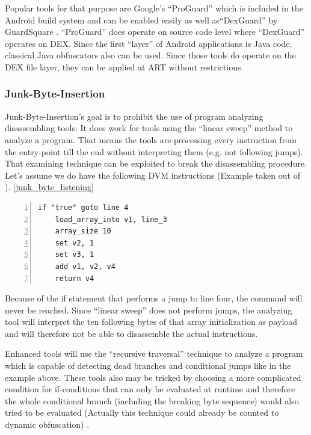 Popular tools for that purpose are Google's ``ProGuard''
\parencite{proguardtool} which is included in the Android build system and
can be enabled easily as well as``DexGuard'' by GuardSquare
\parencite{dexguardtool}. ``ProGuard'' does
operate on source code level where ``DexGuard'' operates on DEX.
Since the first ``layer'' of Android applications is Java code, classical Java
obfuscators also can be used.
Since those tools do operate on the DEX file layer, they can be applied at ART without restrictions.

\subsubsection{Junk-Byte-Insertion}
Junk-Byte-Insertion's goal is to prohibit the use of program analyzing
disassembling tools. It does work for tools using the
``linear sweep'' method to analyze a program. That means
the tools are processing every instruction from the entry-point
till the end without interpreting them (e.g. not following jumps).
That examining technique can be exploited to break the disassembling
procedure. Let's assume we do have the following DVM instructions (Example taken out of \parencite{lvl_imp}).
\autoref{junk_byte_listening}

  \begin{lstlisting}[language={[x64]Assembler}, caption=Junk-Byte-Insertion, label=junk_byte_listening, numbers=left]
    if "true" goto line 4
    load_array_into v1, line_3
    array_size 10
    set v2, 1
    set v3, 1
    add v1, v2, v4
    return v4
  \end{lstlisting}


Because of the if statement that performs a jump to line four, the  command will never be reached.
Since ``linear sweep'' does not perform jumps, the analyzing tool
will interpret the ten following bytes of that array initialization as payload and will therefore not be able to disassemble the actual instructions.

Enhanced tools will use the ``recursive traversal'' technique to analyze a
program which is capable of detecting dead branches and conditional jumps like in the example above.
These tools also may be tricked by choosing a more complicated condition for
if-conditions that can only be evaluated at runtime and therefore the
whole conditional branch (including the breaking byte sequence) would also tried to be evaluated (Actually this technique could already be counted to dynamic obfuscation) \parencite{lvl_imp}.

